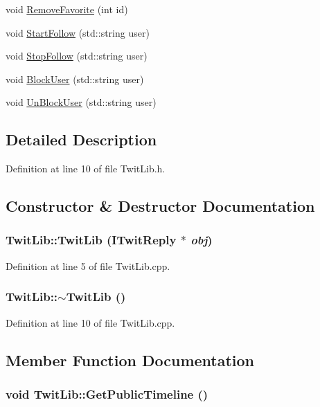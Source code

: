 \begin{CompactItemize}
\item 
void \hyperlink{classTwitLib_3cfdb83433fe9e5675bac209a6db01c6}{RemoveFavorite} (int id)
\item 
void \hyperlink{classTwitLib_26c78a3d62971f17b9b61fbc413438ba}{StartFollow} (std::string user)
\item 
void \hyperlink{classTwitLib_955be6b8ee764e6348e70a055c07c18d}{StopFollow} (std::string user)
\item 
void \hyperlink{classTwitLib_bc66b89dd482ef5407a045e2f8f4709b}{BlockUser} (std::string user)
\item 
void \hyperlink{classTwitLib_0cc001b0c745187cb871508fe3a2bb37}{UnBlockUser} (std::string user)
\end{CompactItemize}


\subsection{Detailed Description}


Definition at line 10 of file TwitLib.h.

\subsection{Constructor \& Destructor Documentation}
\hypertarget{classTwitLib_bbbd7452359f6cdb3b364f23216a5256}{
\subsubsection{\setlength{\rightskip}{0pt plus 5cm}TwitLib::TwitLib ({\bf ITwitReply} $\ast$ {\em obj})}}
\label{classTwitLib_bbbd7452359f6cdb3b364f23216a5256}




Definition at line 5 of file TwitLib.cpp.\hypertarget{classTwitLib_1b5fbc092b2e41432542b8257c04f1d9}{
\subsubsection{\setlength{\rightskip}{0pt plus 5cm}TwitLib::$\sim$TwitLib ()}}
\label{classTwitLib_1b5fbc092b2e41432542b8257c04f1d9}




Definition at line 10 of file TwitLib.cpp.

\subsection{Member Function Documentation}
\hypertarget{classTwitLib_ec4707513fbaa1017cff3ae803900aaf}{
\subsubsection{\setlength{\rightskip}{0pt plus 5cm}void TwitLib::GetPublicTimeline ()}}
\label{classTwitLib_ec4707513fbaa1017cff3ae803900aaf}


